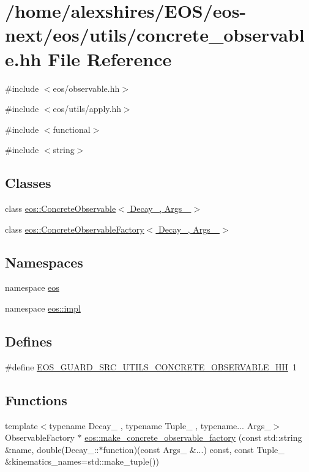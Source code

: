 \hypertarget{concrete__observable_8hh}{
\section{/home/alexshires/EOS/eos-\/next/eos/utils/concrete\_\-observable.hh File Reference}
\label{concrete__observable_8hh}
}
{\ttfamily \#include $<$eos/observable.hh$>$}\par
{\ttfamily \#include $<$eos/utils/apply.hh$>$}\par
{\ttfamily \#include $<$functional$>$}\par
{\ttfamily \#include $<$string$>$}\par
\subsection*{Classes}
\begin{DoxyCompactItemize}
\item 
class \hyperlink{classeos_1_1ConcreteObservable}{eos::ConcreteObservable$<$ Decay\_\-, Args\_\- $>$}
\item 
class \hyperlink{classeos_1_1ConcreteObservableFactory}{eos::ConcreteObservableFactory$<$ Decay\_\-, Args\_\- $>$}
\end{DoxyCompactItemize}
\subsection*{Namespaces}
\begin{DoxyCompactItemize}
\item 
namespace \hyperlink{namespaceeos}{eos}
\item 
namespace \hyperlink{namespaceeos_1_1impl}{eos::impl}
\end{DoxyCompactItemize}
\subsection*{Defines}
\begin{DoxyCompactItemize}
\item 
\#define \hyperlink{concrete__observable_8hh_acd6abb229f6dbdbe16b1875ab4596894}{EOS\_\-GUARD\_\-SRC\_\-UTILS\_\-CONCRETE\_\-OBSERVABLE\_\-HH}~1
\end{DoxyCompactItemize}
\subsection*{Functions}
\begin{DoxyCompactItemize}
\item 
{\footnotesize template$<$typename Decay\_\- , typename Tuple\_\- , typename... Args\_\-$>$ }\\ObservableFactory $\ast$ \hyperlink{namespaceeos_a70620ec1b39b5dbcd70937b6065665a0}{eos::make\_\-concrete\_\-observable\_\-factory} (const std::string \&name, double(Decay\_\-::$\ast$function)(const Args\_\- \&...) const, const Tuple\_\- \&kinematics\_\-names=std::make\_\-tuple())
\end{DoxyCompactItemize}


